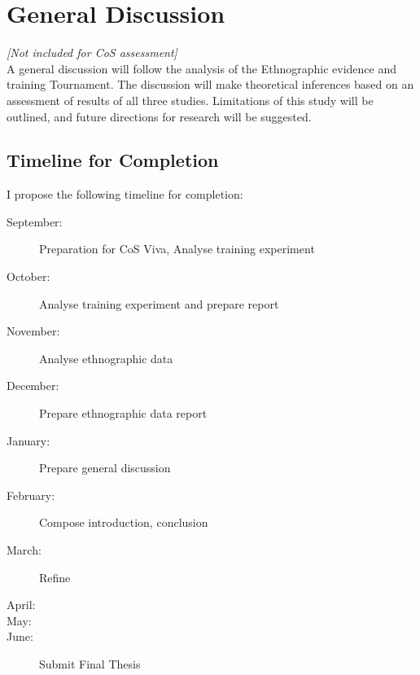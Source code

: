 \chapter{\label{generalDiscussion}General Discussion}

\textit{[Not included for CoS assessment]} \\
A general discussion will follow the analysis of the Ethnographic evidence and  training Tournament. The discussion will make theoretical inferences based on an assessment of results of all three studies.  Limitations of this study will be outlined, and future directions for research will be suggested.

\section{Timeline for Completion}
I propose the following timeline for completion:

\begin{description}
  \item [September:] Preparation for CoS Viva, Analyse training experiment
  \item [October:] Analyse training experiment and prepare report
  \item [November:] Analyse ethnographic data
  \item [December:] Prepare ethnographic data report
  \item [January:] Prepare general discussion
  \item [February:] Compose introduction, conclusion
  \item [March:] Refine
  \item [April:]
  \item [May:]
  \item [June:] Submit Final Thesis
\end{description}
